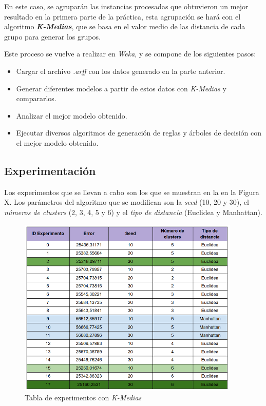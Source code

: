 \documentclass[12pt,a4paper, xcolor=table]{article}
\begin{document}
En este caso, se agruparán las instancias procesadas que obtuvieron un mejor resultado en la primera parte de la práctica, esta agrupación se hará con el algoritmo \textbf{\textit{K-Medias}}, que se basa en el valor medio de las distancia de cada grupo para generar los grupos. 

\vspace{1mm}

Este proceso se vuelve a realizar en \textit{Weka}, y se compone de los siguientes pasos:

\begin{itemize}
    \item Cargar el archivo \textit{.arff} con los datos generado en la parte anterior.
    \item Generar diferentes modelos a partir de estos datos con \textit{K-Medias} y compararlos.
    \item Analizar el mejor modelo obtenido.
    \item Ejecutar diversos algoritmos de generación de reglas y árboles de decisión con el mejor modelo obtenido.
\end{itemize}


\subsection{Experimentación}

Los experimentos que se llevan a cabo son los que se muestran en la en la Figura X. Los parámetros del algoritmo que se modifican son la \textit{seed} (10, 20 y 30), el \textit{números de clusters} (2, 3, 4, 5 y 6) y el \textit{tipo de distancia} (Euclidea y Manhattan).

\begin{figure}[h]
    \centering
    \includegraphics[width=400px]{img/experimentos.png}
    \caption{Tabla de experimentos con \textit{K-Medias}}
    \label{fig:graf_exp1}
\end{figure}
\end{document}
